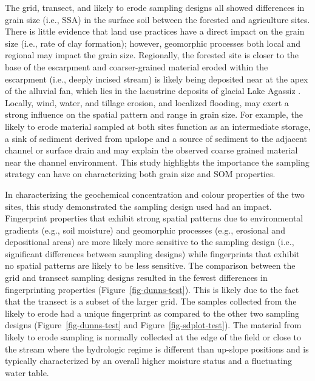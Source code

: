 \documentclass[
  number]{elsarticle}
\begin{document}
The grid, transect, and likely to erode sampling designs all showed
differences in grain size (i.e., SSA) in the surface soil between the
forested and agriculture sites. There is little evidence that land use
practices have a direct impact on the grain size (i.e., rate of clay
formation); however, geomorphic processes both local and regional may
impact the grain size. Regionally, the forested site is closer to the
base of the escarpment and coarser-grained material eroded within the
escarpment (i.e., deeply incised stream) is likely being deposited near
at the apex of the alluvial fan, which lies in the lacustrine deposits
of glacial Lake Agassiz \citep{mcginn1979}. Locally, wind, water, and
tillage erosion, and localized flooding, may exert a strong influence on
the spatial pattern and range in grain size. For example, the likely to
erode material sampled at both sites function as an intermediate
storage, a sink of sediment derived from upslope and a source of
sediment to the adjacent channel or surface drain and may explain the
observed coarse grained material near the channel environment. This
study highlights the importance the sampling strategy can have on
characterizing both grain size and SOM properties.

In characterizing the geochemical concentration and colour properties of
the two sites, this study demonstrated the sampling design used had an
impact. Fingerprint properties that exhibit strong spatial patterns due
to environmental gradients (e.g., soil moisture) and geomorphic
processes (e.g., erosional and depositional areas)
\citep{hoffmann2009, borch2010} are more likely more sensitive to the
sampling design (i.e., significant differences between sampling designs)
while fingerprints that exhibit no spatial patterns are likely to be
less sensitive. The comparison between the grid and transect sampling
designs resulted in the fewest differences in fingerprinting properties
(Figure~\ref{fig-dunns-test}). This is likely due to the fact that the
transect is a subset of the larger grid. The samples collected from the
likely to erode had a unique fingerprint as compared to the other two
sampling designs (Figure~\ref{fig-dunns-test} and
Figure~\ref{fig-sdplot-test}). The material from likely to erode
sampling is normally collected at the edge of the field or close to the
stream where the hydrologic regime is different than up-slope positions
and is typically characterized by an overall higher moisture status and
a fluctuating water table.
\end{document}
